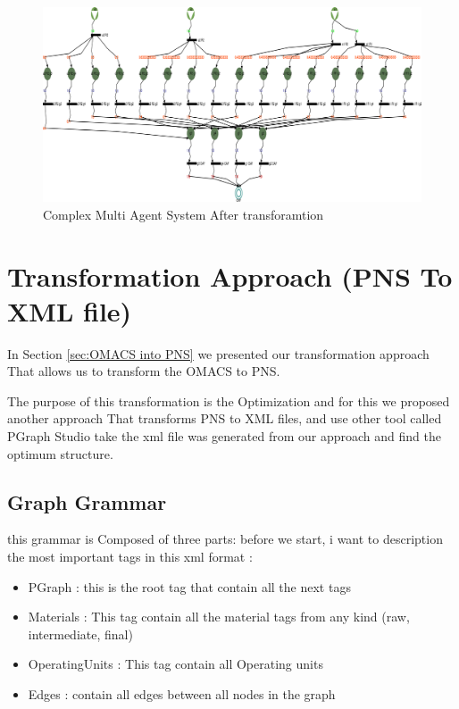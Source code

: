  \begin{landscape}
\begin{figure}[th]
	\centering 
 	\includegraphics[scale=1.3]{ch3/img/articlePNS2}
	\caption{\label{fig:Complex Multi Agent System After transforamtion}Complex Multi Agent System After transforamtion}
\end{figure} 
 
 \end{landscape}


%
%
\section{Transformation Approach (PNS To XML file)\label{sec:xml} }
In Section \ref{sec:OMACS into PNS} we presented our transformation approach That allows us to transform the OMACS to PNS.

The purpose of this transformation is the Optimization and for this we proposed another approach That transforms PNS to XML 
files, and use other tool called PGraph Studio take the xml file was generated from our approach and find the optimum structure.

\subsection{ Graph Grammar }
this grammar is Composed of three parts: 
before we start, i want to description the most important tags in this xml format :
\begin{itemize}

\newcommand{\localtextbulletone}{\textcolor{gray}{\raisebox{.45ex}{\rule{.6ex}{.6ex}}}}
\renewcommand{\labelitemi}{\localtextbulletone}
\item PGraph : this is the root tag that contain all the next tags
\item Materials : This tag contain all the material tags from any kind (raw, intermediate, final)
\item OperatingUnits : This tag contain all Operating units
\item Edges : contain all edges between all nodes in the graph
\end{itemize} 

